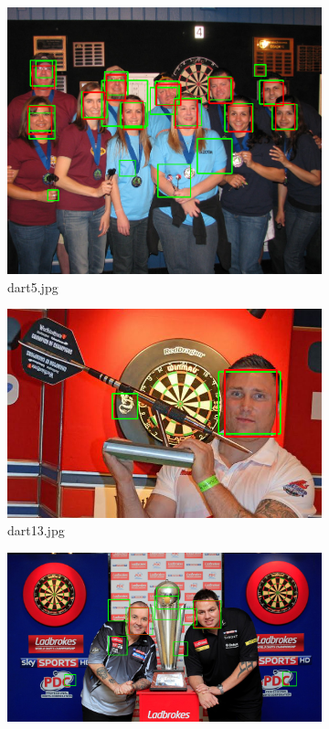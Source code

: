 \documentclass[11pt,a4paper, twocolumn]{article}
\begin{document}
\begin{figure}[h!]
\begin{subfigure}[b]{0.4\linewidth}
				\includegraphics[width=\linewidth]{dart5_post.png}
				\caption{dart5.jpg}
			\end{subfigure}
			\begin{subfigure}[b]{0.4\linewidth}
				\includegraphics[width=\linewidth]{dart13_post.png}
				\caption{dart13.jpg}
			\end{subfigure}
			\begin{subfigure}[b]{0.4\linewidth}
				\includegraphics[width=\linewidth]{dart14_post.png}

\end{subfigure}
\end{figure}
\end{document}
